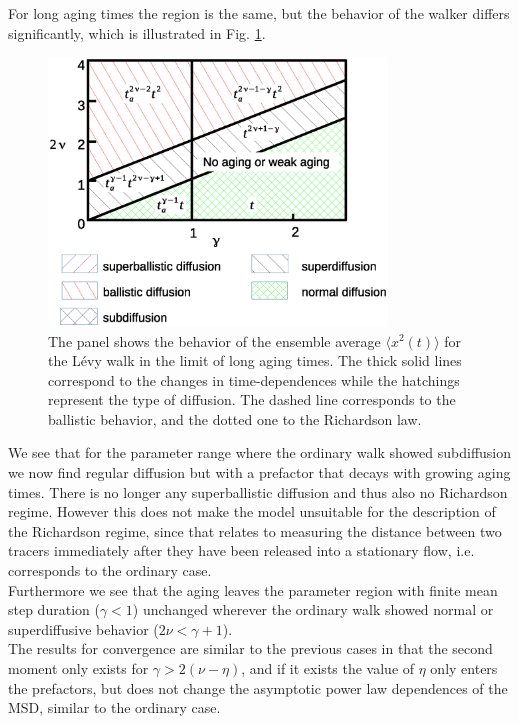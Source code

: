 For long aging times the region is the same, but the behavior of the walker differs significantly, which is illustrated in Fig. \ref{fig:resultsMSDaged}. 
%
\begin{figure}[h!]
\begin{center}
\includegraphics[width=90mm]{pics/resultsMSDaged.eps}
\caption{The panel shows the behavior of the ensemble average $\langle x^2(t) \rangle$ for the L\'evy walk in the limit of long aging times. The thick solid lines correspond to the changes in time-dependences while the hatchings represent the type of diffusion. The dashed line corresponds to the ballistic behavior, and the dotted one to the Richardson law.
\label{fig:resultsMSDaged} }
\end{center}
\end{figure} 
%
We see that for the parameter range where the ordinary walk showed subdiffusion we now find regular diffusion but with a prefactor that decays with growing aging times. There is no longer any superballistic diffusion and thus also no Richardson regime. However this does not make the model unsuitable for the description of the Richardson regime, since that relates to measuring the distance between two tracers immediately after they have been released into a stationary flow, i.e. corresponds to the ordinary case.\\ Furthermore we see that the aging leaves the parameter region with finite mean step duration ($\gamma<1$) unchanged wherever the ordinary walk showed normal or superdiffusive behavior ($2\nu < \gamma +1$).\\
The results for convergence are similar to the previous cases in that the second moment only exists for $\gamma>2(\nu-\eta)$, and if it exists the value of $\eta$ only enters the prefactors, but does not change the asymptotic power law dependences of the MSD, similar to the ordinary case.\\


